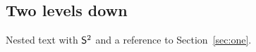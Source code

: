 \subsection{Two levels down}
Nested text with $\mathsf{S}^2$ and a reference to Section~\ref{sec:one}.
